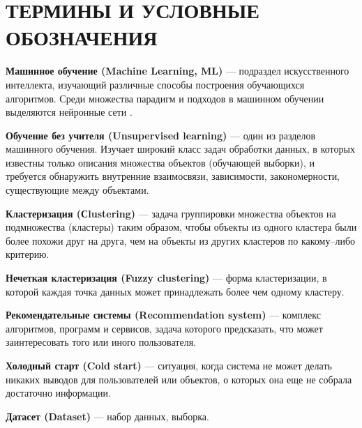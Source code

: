\section*{ТЕРМИНЫ И УСЛОВНЫЕ ОБОЗНАЧЕНИЯ}

\textbf{Машинное обучение (Machine Learning, ML)} --- подраздел искусственного интеллекта, изучающий различные способы построения обучающихся алгоритмов. Среди множества парадигм и подходов в машинном обучении выделяются нейронные сети \cite{ClusterFO}. 

\textbf{Обучение без учителя (Unsupervised learning)} --- один из разделов машинного обучения. Изучает широкий класс задач обработки данных, в которых известны только описания множества объектов (обучающей выборки), и требуется обнаружить внутренние взаимосвязи, зависимости, закономерности, существующие между объектами.  

\textbf{Кластеризация (Сlustering)} --- задача группировки множества объектов на подмножества (кластеры) таким образом, чтобы объекты из одного кластера были более похожи друг на друга, чем на объекты из других кластеров по какому–либо критерию. 

\textbf{Нечеткая кластеризация (Fuzzy clustering)} --- форма кластеризации, в которой каждая точка данных может принадлежать более чем одному кластеру.

\textbf{Рекомендательные системы (Recommendation system)}  --- комплекс алгоритмов, программ и сервисов, задача которого предсказать, что может заинтересовать того или иного пользователя.  

\textbf{Холодный старт (Cold start)} --- ситуация, когда система не может делать никаких
выводов для пользователей или объектов, о которых она еще не собрала
достаточно информации.

\textbf{Датасет (Dataset)} --- набор данных, выборка.

\pagebreak